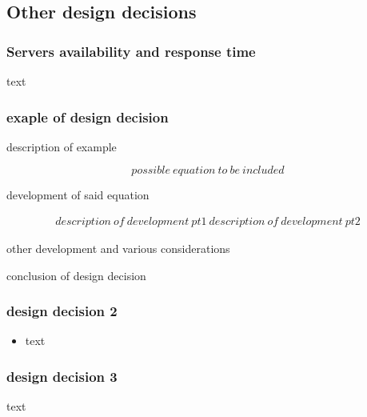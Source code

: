 \documentclass[table, 12pt]{article}
\newcounter{testexample}
\begin{document}
\newpage


\subsection{Other design decisions}
\label{other_design_decisions}
\subsubsection{Servers availability and response time} 
\label{server_availability}
text
\subsubsection{exaple of design decision} 
description of example

\begin{equation}
    possible\  equation \ to \ be \  included 
\end{equation}

development of said equation 

\begin{align}  
    description\ of\ development\ pt1\
    description\ of\ development\ pt2
\end{align}

other development and various considerations


 conclusion of design decision

 \subsubsection{design decision 2} 
    \begin{itemize}
        \item text
    \end{itemize}

\subsubsection{design decision 3} text

\newpage
\end{document}
